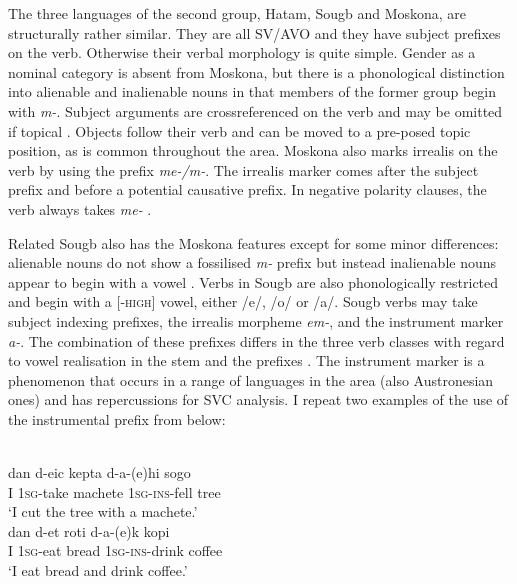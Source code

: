 The three languages of the second group, Hatam, Sougb and Moskona, are structurally rather similar. They are all SV/AVO and they have subject prefixes on the verb. Otherwise their verbal morphology is quite simple. Gender as a nominal category is absent from Moskona, but there is a phonological distinction into alienable and inalienable nouns in that members of the former group begin with \textit{m-}. Subject arguments are crossreferenced on the verb and may be omitted if topical \citep[269]{gravelle2010grammar}. Objects follow their verb and can be moved to a pre-posed topic position, as is common throughout the area. Moskona also marks irrealis on the verb by using the prefix \textit{me-/m-}. The irrealis marker comes after the subject prefix and before a potential causative prefix. In negative polarity clauses, the verb always takes \textit{me-} \citep[110]{gravelle2010grammar}. 

Related Sougb also has the Moskona features except for some minor differences: alienable nouns do not show a fossilised \textit{m-} prefix but instead inalienable nouns appear to begin with a vowel \citep[218]{reesink2002grammar}. Verbs in Sougb are also phonologically restricted and begin with a [-\textsc{high}] vowel, either /e/, /o/ or /a/. Sougb verbs may take subject indexing prefixes, the irrealis morpheme \textit{em-}, and the instrument marker \textit{a-}. The combination of these prefixes differs in the three verb classes with regard to vowel realisation in the stem and the prefixes \citep{reesink2002grammar}. The instrument marker is a phenomenon that occurs in a range of languages in the area (also Austronesian ones) and has repercussions for SVC analysis. I repeat two examples of the use of the instrumental prefix from \citet{reesink2002grammar} below:

\ea
{}\\
\ea
\gll dan d-eic kepta d-a-(e)hi sogo \\
I \textsc{1}\textsc{sg}-take machete \textsc{1}\textsc{sg}-\textsc{ins}-fell tree \\
\glft `I cut the tree with a machete.' \\ 
\ex \label{sougb1}
\gll dan d-et roti d-a-(e)k kopi \\ 
I \textsc{1}\textsc{sg}-eat bread \textsc{1}\textsc{sg}-\textsc{ins}-drink coffee \\
\glft `I eat bread and drink coffee.'
\z
\z

